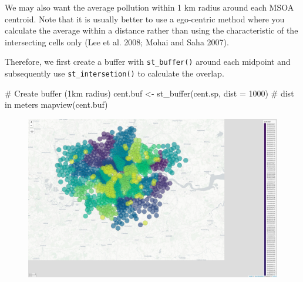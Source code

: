 \documentclass[
  letterpaper,
  DIV=11,
  numbers=noendperiod]{scrreprt}
\newenvironment{Shaded}{\begin{snugshade}}{\end{snugshade}}
\newcommand{\AttributeTok}[1]{\textcolor[rgb]{0.40,0.45,0.13}{#1}}
\newcommand{\CommentTok}[1]{\textcolor[rgb]{0.37,0.37,0.37}{#1}}
\newcommand{\DecValTok}[1]{\textcolor[rgb]{0.68,0.00,0.00}{#1}}
\newcommand{\FunctionTok}[1]{\textcolor[rgb]{0.28,0.35,0.67}{#1}}
\newcommand{\NormalTok}[1]{\textcolor[rgb]{0.00,0.23,0.31}{#1}}
\newcommand{\OtherTok}[1]{\textcolor[rgb]{0.00,0.23,0.31}{#1}}
\newcommand{\SpecialCharTok}[1]{\textcolor[rgb]{0.37,0.37,0.37}{#1}}
\begin{document}
We may also want the average pollution within 1 km radius around each
MSOA centroid. Note that it is usually better to use a ego-centric
method where you calculate the average within a distance rather than
using the characteristic of the intersecting cells only (Lee et al.
2008; Mohai and Saha 2007).

Therefore, we first create a buffer with \texttt{st\_buffer()} around
each midpoint and subsequently use \texttt{st\_intersetion()} to
calculate the overlap.

\begin{Shaded}
\begin{Highlighting}[]
\CommentTok{\# Create buffer (1km radius)}
\NormalTok{cent.buf }\OtherTok{\textless{}{-}} \FunctionTok{st\_buffer}\NormalTok{(cent.sp, }
                      \AttributeTok{dist =} \DecValTok{1000}\NormalTok{) }\CommentTok{\# dist in meters}
\FunctionTok{mapview}\NormalTok{(cent.buf)}
\end{Highlighting}
\end{Shaded}

\begin{figure}[H]

{\centering \includegraphics{01_refresher_short_files/figure-pdf/unnamed-chunk-29-1.pdf}

}

\end{figure}

\begin{Shaded}
\end{Shaded}
\end{document}
